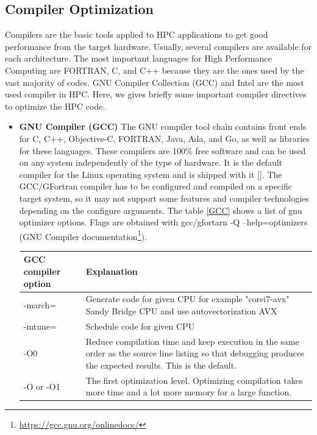 \subsection{Compiler Optimization}
Compilers are the basic tools applied to HPC applications to get good performance from the target hardware. Usually, several compilers are available for each architecture. The most important languages for High Performance Computing are FORTRAN, C, and C++ because they are the ones used by the vast majority of codes. GNU Compiler Collection (GCC) and Intel are the most used compiler in HPC. Here, we gives briefly some important compiler directives to optimize the HPC code.
\begin{itemize}
\item \textbf{GNU Compiler (GCC)}
The GNU compiler tool chain contains front ends for C, C++, Objective-C, FORTRAN, Java, Ada, and Go, as well as libraries for these languages. These compilers are 100\% free software and can be used on any system independently of the type of hardware. It is the default compiler for the Linux operating system and is shipped with it []. The GCC/GFortran compiler has to be configured and compiled on a specific target system, so it may not support some features and compiler technologies depending on the configure arguments. The table \ref{GCC} shows a list of gnu optimizer options. Flags are obtained with gcc/gfortarn -Q --help=optimizers (GNU Compiler documentation\footnote{\url{https://gcc.gnu.org/onlinedocs/}}).
\begin{table}[!h]
\centering
\begin{tabularx}{\linewidth}{|X|X|}
\hline
\textbf{GCC compiler option} & \textbf{Explanation} \\
\hline
\hline
-march= & Generate code for given CPU for example "corei7-avx" Sandy Bridge CPU and use autovectorization AVX \\
\hline
-mtune= & Schedule code for given CPU \\
\hline
-O0 & Reduce compilation time and keep execution in the same order as the source line listing so that debugging produces the expected results. This is the default. \\
\hline
-O or -O1  & The first optimization level. Optimizing compilation takes more time and a lot more memory for a large function.


\end{tabularx}
\end{table}
\end{itemize}
